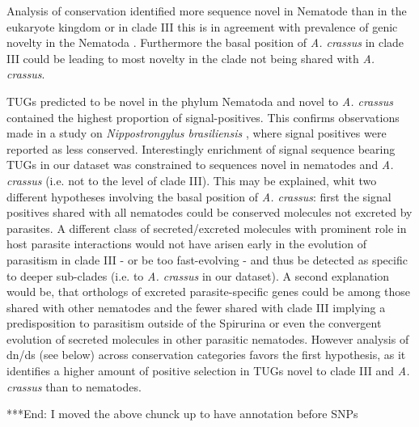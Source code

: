 \documentclass[10pt]{bmc_article}
\newenvironment{bmcformat}{\begin{raggedright}\baselineskip20pt\sloppy\setboolean{publ}{false}}{\end{raggedright}\baselineskip20pt\sloppy}
\begin{document}
\begin{bmcformat}
Analysis of conservation identified more sequence novel in Nematode
than in the eukaryote kingdom or in clade III this is in agreement
with prevalence of genic novelty in the Nematoda
\cite{wasmuth_extent_2008}. Furthermore the basal position of
\textit{A. crassus} in clade III could be leading to most novelty in
the clade not being shared with \textit{A. crassus}.

TUGs predicted to be novel in the phylum Nematoda and novel to
\textit{A. crassus} contained the highest proportion of
signal-positives. This confirms observations made in a study on
\textit{Nippostrongylus brasiliensis} \cite{harcus_signal_2004}, where
signal positives were reported as less conserved. Interestingly
enrichment of signal sequence bearing TUGs in our dataset was
constrained to sequences novel in nematodes and \textit{A. crassus}
(i.e. not to the level of clade III). This may be explained, whit two
different hypotheses involving the basal position of
\textit{A. crassus}: first the signal positives shared with all
nematodes could be conserved molecules not excreted by parasites. A
different class of secreted/excreted molecules with prominent role in
host parasite interactions would not have arisen early in the
evolution of parasitism in clade III - or be too fast-evolving - and
thus be detected as specific to deeper sub-clades (i.e. to
\textit{A. crassus} in our dataset). A second explanation would be,
that orthologs of excreted parasite-specific genes could be among
those shared with other nematodes and the fewer shared with clade III
implying a predisposition to parasitism outside of the Spirurina or
even the convergent evolution of secreted molecules in other parasitic
nematodes. However analysis of dn/ds (see below) across conservation
categories favors the first hypothesis, as it identifies a higher
amount of positive selection in TUGs novel to clade III and
\textit{A. crassus} than to nematodes.

***End: I moved the above chunck up to have annotation before SNPs


\end{bmcformat}
\end{document}

